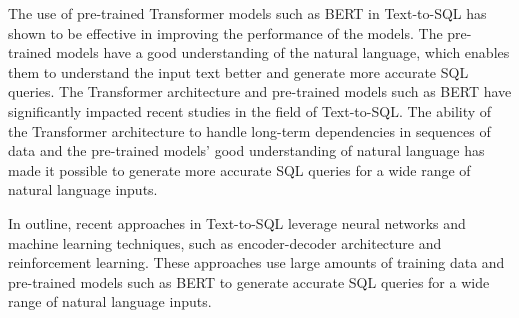 The use of pre-trained Transformer models such as BERT in Text-to-SQL has shown to be effective in improving the performance of the models. The pre-trained models have a good understanding of the natural language, which enables them to understand the input text better and generate more accurate SQL queries.
The Transformer architecture and pre-trained models such as BERT have significantly impacted recent studies in the field of Text-to-SQL. The ability of the Transformer architecture to handle long-term dependencies in sequences of data and the pre-trained models' good understanding of natural language has made it possible to generate more accurate SQL queries for a wide range of natural language inputs.

In outline, recent approaches in Text-to-SQL leverage neural networks and machine learning techniques, such as encoder-decoder architecture and reinforcement learning. These approaches use large amounts of training data and pre-trained models such as BERT to generate accurate SQL queries for a wide range of natural language inputs.